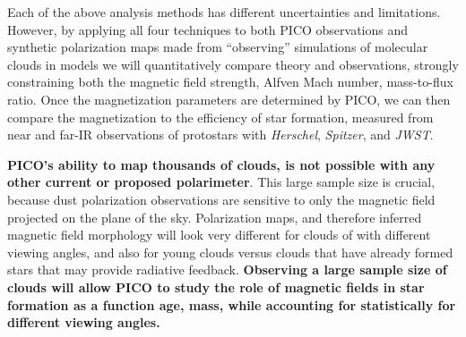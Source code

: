 \documentclass[PICOReport.tex]{subfiles}
\begin{document}
Each of the above analysis methods has different uncertainties and limitations.  However, by applying all four techniques to both PICO observations and synthetic polarization maps made from ``observing'' simulations of molecular clouds in models we will quantitatively compare theory and observations, strongly constraining both the magnetic field strength, Alfven Mach number, mass-to-flux ratio.  Once the magnetization parameters are determined by PICO, we can then compare the magnetization to the efficiency of star formation, measured from near and far-IR observations of protostars with {\em Herschel}, {\em Spitzer}, and {\em JWST}. 

{\bf PICO's ability to map thousands of clouds, is not possible with any other current or proposed polarimeter}. This large sample size is crucial, because dust polarization observations are sensitive to only the magnetic field projected on the plane of the sky.  Polarization maps, and therefore inferred magnetic field morphology will look very different for clouds of with different viewing angles, and also for young clouds versus clouds that have already formed stars that may provide radiative feedback.  {\bf Observing a large sample size of clouds will allow PICO to study the role of magnetic fields in star formation as a function age, mass, while accounting for statistically for different viewing angles.}
\end{document}
